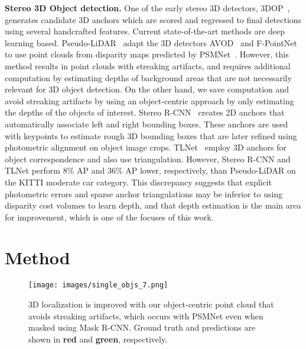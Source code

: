 \documentclass[letterpaper, 10 pt, conference]{ieeeconf}
\begin{document}
\textbf{Stereo 3D Object detection.} One of the early stereo 3D detectors, 3DOP~\cite{chen_3dop}, generates candidate 3D anchors which are scored and regressed to final detections using several handcrafted features. Current state-of-the-art methods are deep learning based. Pseudo-LiDAR~\cite{wang2018pseudo} adapt the 3D detectors AVOD~\cite{ku_avod} and F-PointNet~\cite{qi_fpointnet} to use point clouds from disparity maps predicted by PSMNet~\cite{chang2018psmnet}. However, this method results in point clouds with streaking artifacts, and requires additional computation by estimating depths of background areas that are not necessarily relevant for 3D object detection. On the other hand, we save computation and avoid streaking artifacts by using an object-centric approach by only estimating the depths of the objects of interest. Stereo R-CNN~\cite{li2019stereo_rcnn} creates 2D anchors that automatically associate left and right bounding boxes. These anchors are used with keypoints to estimate rough 3D bounding boxes that are later refined using photometric alignment on object image crops. TLNet~\cite{qin2019triangulation} employ 3D anchors for object correspondence and also use triangulation. However, Stereo R-CNN and TLNet perform 8\% AP and 36\% AP lower, respectively, than Pseudo-LiDAR on the KITTI moderate car category. This discrepancy suggests that explicit photometric errors and sparse anchor triangulations may be inferior to using disparity cost volumes to learn depth, and that depth estimation is the main area for improvement, which is one of the focuses of this work.



\section{Method}
\label{sec:method}

\begin{figure*}[t]
	\begin{center}
		\texttt{[image: images/single\_objs\_7.png]}
	\end{center}
	\caption{3D localization is improved with our object-centric point cloud that avoids streaking artifacts, which occurs with PSMNet even when masked using Mask R-CNN. Ground truth and predictions are shown in \textbf{red} and \textbf{green}, respectively.}
	\label{fig:single_obj_comparison}
\end{figure*}
\end{document}
